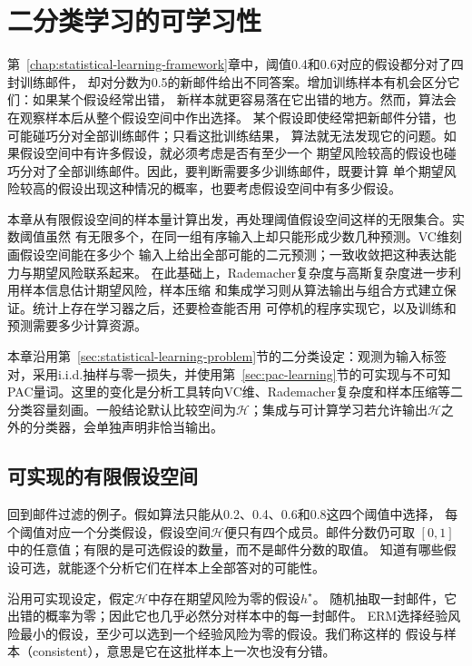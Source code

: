 \chapter{二分类学习的可学习性}
\label{chap:binary-learnability}

第~\ref{chap:statistical-learning-framework}章中，阈值0.4和0.6对应的假设都分对了四封训练邮件，
却对分数为0.5的新邮件给出不同答案。增加训练样本有机会区分它们：如果某个假设经常出错，
新样本就更容易落在它出错的地方。然而，算法会在观察样本后从整个假设空间中作出选择。
某个假设即使经常把新邮件分错，也可能碰巧分对全部训练邮件；只看这批训练结果，
算法就无法发现它的问题。如果假设空间中有许多假设，就必须考虑是否有至少一个
期望风险较高的假设也碰巧分对了全部训练邮件。因此，要判断需要多少训练邮件，既要计算
单个期望风险较高的假设出现这种情况的概率，也要考虑假设空间中有多少假设。

本章从有限假设空间的样本量计算出发，再处理阈值假设空间这样的无限集合。实数阈值虽然
有无限多个，在同一组有序输入上却只能形成少数几种预测。VC维刻画假设空间能在多少个
输入上给出全部可能的二元预测；一致收敛把这种表达能力与期望风险联系起来。
在此基础上，Rademacher复杂度与高斯复杂度进一步利用样本信息估计期望风险，样本压缩
和集成学习则从算法输出与组合方式建立保证。统计上存在学习器之后，还要检查能否用
可停机的程序实现它，以及训练和预测需要多少计算资源。

本章沿用第~\ref{sec:statistical-learning-problem}节的二分类设定：观测为输入标签对，采用i.i.d.抽样与零一损失，并使用第~\ref{sec:pac-learning}节的可实现与不可知PAC量词。这里的变化是分析工具转向VC维、Rademacher复杂度和样本压缩等二分类容量刻画。一般结论默认比较空间为$\mathcal H$；集成与可计算学习若允许输出$\mathcal H$之外的分类器，会单独声明非恰当输出。

\section{可实现的有限假设空间}
\label{sec:binary-finite-class}

回到邮件过滤的例子。假如算法只能从0.2、0.4、0.6和0.8这四个阈值中选择，
每个阈值对应一个分类假设，假设空间$\mathcal H$便只有四个成员。邮件分数仍可取
$[0,1]$中的任意值；有限的是可选假设的数量，而不是邮件分数的取值。
知道有哪些假设可选，就能逐个分析它们在样本上全部答对的可能性。

沿用可实现设定，假定$\mathcal H$中存在期望风险为零的假设$h^\star$。
随机抽取一封邮件，它出错的概率为零；因此它也几乎必然分对样本中的每一封邮件。
ERM选择经验风险最小的假设，至少可以选到一个经验风险为零的假设。我们称这样的
假设与样本（consistent），意思是它在这批样本上一次也没有分错。

